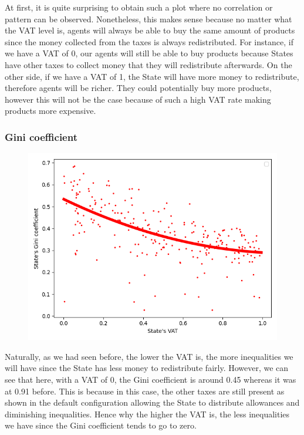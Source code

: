         { At first, it is quite surprising to obtain such a plot where no correlation or pattern can be observed. Nonetheless, this makes sense because no matter what the VAT level is, agents will always be able to buy the same amount of products since the money collected from the taxes is always redistributed. For instance, if we have a VAT of 0, our agents will still be able to buy products because States have other taxes to collect money that they will redistribute afterwards. On the other side, if we have a VAT of 1, the State will have more money to redistribute, therefore agents will be richer. They could potentially buy more products, however this will not be the case because of such a high VAT rate making products more expensive.
        \par

        \subsubsection{Gini coefficient}

        \begin{figure}
            \includegraphics[width=\linewidth]{img/exp/2_3.png}
        \end{figure} 
        { \lipsum[1-2] Naturally, as we had seen before, the lower the VAT is, the more inequalities we will have since the State has less money to redistribute fairly. However, we can see that here, with a VAT of 0, the Gini coefficient is around 0.45 whereas it was at 0.91 before. This is because in this case, the other taxes are still present as shown in the default configuration allowing the State to distribute allowances and diminishing inequalities. Hence why the higher the VAT is, the less inequalities we have since the Gini coefficient tends to go to zero.
        \par

}}
